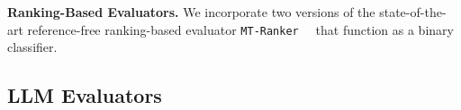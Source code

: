 \documentclass{article}
\theoremstyle{plain}
\theoremstyle{definition}
\theoremstyle{remark}
\newcommand{\ranker}{\texttt{MT-Ranker }}
\begin{document}
\noindent
\textbf{Ranking-Based Evaluators.} 
We incorporate two versions of the state-of-the-art reference-free ranking-based evaluator \ranker~\citep{MT-RANKER} that function as a binary classifier.





\subsection{LLM Evaluators}
\label{sec:llm_evaluators}
\end{document}
